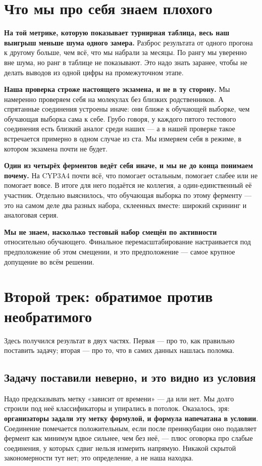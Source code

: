 \documentclass[11pt,a4paper]{article}
\begin{document}
\section{Что мы про себя знаем плохого}
\label{sec:limits}

\textbf{На той метрике, которую показывает турнирная таблица, весь наш выигрыш меньше шума
одного замера.} Разброс результата от одного прогона к другому больше, чем всё, что мы набрали
за месяцы. По рангу мы уверенно вне шума, но ранг в таблице не показывают. Это надо знать
заранее, чтобы не делать выводов из одной цифры на промежуточном этапе.

\textbf{Наша проверка строже настоящего экзамена, и не в ту сторону.} Мы намеренно проверяем
себя на молекулах без близких родственников. А спрятанные соединения устроены иначе: они
ближе к обучающей выборке, чем обучающая выборка сама к себе. Грубо говоря, у каждого пятого
тестового соединения есть близкий аналог среди наших --- а в нашей проверке такое встречается
примерно в одном случае из ста. Мы измеряем себя в режиме, в котором экзамена почти не будет.

\textbf{Один из четырёх ферментов ведёт себя иначе, и мы не до конца понимаем почему.}
На CYP3A4 почти всё, что помогает остальным, помогает слабее или не помогает вовсе. В итоге
для него подаётся не коллегия, а один-единственный её участник. Отдельно выяснилось, что
обучающая выборка по этому ферменту --- это на самом деле два разных набора, склеенных вместе:
широкий скрининг и аналоговая серия.

\textbf{Мы не знаем, насколько тестовый набор смещён по активности} относительно обучающего.
Финальное перемасштабирование настраивается под предположение об этом смещении, и это
предположение --- самое крупное допущение во всём решении.

\section{Второй трек: обратимое против необратимого}

Здесь получился результат в двух частях. Первая --- про то, как правильно поставить задачу;
вторая --- про то, что в самих данных нашлась поломка.

\subsection*{Задачу поставили неверно, и это видно из условия}

Надо предсказывать метку «зависит от времени» --- да или нет. Мы долго строили под неё
классификаторы и упирались в потолок. Оказалось, зря: \textbf{организаторы задали эту метку
формулой, и формула напечатана в условии}. Соединение помечается положительным, если после
преинкубации оно подавляет фермент как минимум вдвое сильнее, чем без неё, --- плюс оговорка про
слабые соединения, у которых сдвиг нельзя измерить напрямую. Никакой скрытой закономерности тут
нет; это определение, а не наша находка.
\end{document}
